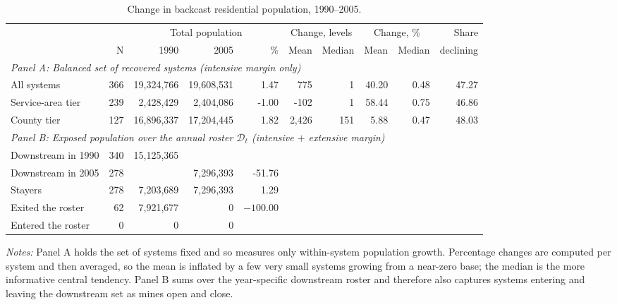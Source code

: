 \begin{table}[ht]
\centering
\caption{Change in backcast residential population, 1990--2005.}
\label{tab:backcast_change}
\begin{adjustbox}{max width=\textwidth}
\begin{tabular}{lrrrrrrrrr}
\toprule
& & \multicolumn{3}{c}{Total population} & \multicolumn{2}{c}{Change, levels} & \multicolumn{2}{c}{Change, \%} & Share \\
\cmidrule(lr){3-5}\cmidrule(lr){6-7}\cmidrule(lr){8-9}
& N & 1990 & 2005 & \% & Mean & Median & Mean & Median & declining \\
\midrule
\multicolumn{10}{l}{\textit{Panel A: Balanced set of recovered systems (intensive margin only)}} \\
All systems & 366 & 19,324,766 & 19,608,531 & 1.47 & 775 & 1 & 40.20 & 0.48 & 47.27 \\
\quad Service-area tier & 239 & 2,428,429 & 2,404,086 & -1.00 & -102 & 1 & 58.44 & 0.75 & 46.86 \\
\quad County tier & 127 & 16,896,337 & 17,204,445 & 1.82 & 2,426 & 151 & 5.88 & 0.47 & 48.03 \\
\midrule
\multicolumn{10}{l}{\textit{Panel B: Exposed population over the annual roster $\mathcal{D}_t$ (intensive $+$ extensive margin)}} \\
Downstream in 1990 & 340 & 15,125,365 & & & & & & & \\
Downstream in 2005 & 278 & & 7,296,393 & -51.76 & & & & & \\
\quad Stayers & 278 & 7,203,689 & 7,296,393 & 1.29 & & & & & \\
\quad Exited the roster & 62 & 7,921,677 & 0 & $-100.00$ & & & & & \\
\quad Entered the roster & 0 & 0 & 0 & & & & & & \\
\bottomrule
\end{tabular}
\end{adjustbox}
\begin{minipage}{\textwidth}\footnotesize\raggedright
\vspace{0.5em}
\textit{Notes:} Panel A holds the set of systems fixed and so measures only within-system population growth. Percentage changes are computed per system and then averaged, so the mean is inflated by a few very small systems growing from a near-zero base; the median is the more informative central tendency. Panel B sums over the year-specific downstream roster and therefore also captures systems entering and leaving the downstream set as mines open and close.
\end{minipage}
\end{table}
